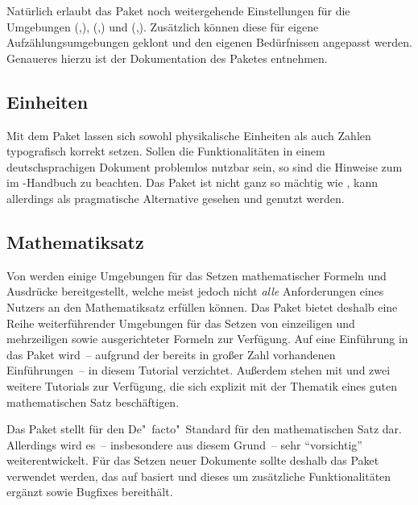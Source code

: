 \documentclass[%
  english,ngerman,%
  cdgeometry=no,DIV=12,%
  automark,%
  listof=toc,%
]{tudscrartcl}
\begin{document}
Natürlich erlaubt das Paket noch weitergehende Einstellungen für die Umgebungen 
(,),
(,) und
(,). 
Zusätzlich können diese für eigene Aufzählungsumgebungen geklont und den 
eigenen Bedürfnissen angepasst werden. Genaueres hierzu ist der Dokumentation 
des Paketes  entnehmen.


\subsection{Einheiten}
Mit dem Paket  lassen sich sowohl physikalische Einheiten als 
auch Zahlen typografisch korrekt setzen. Sollen die Funktionalitäten in einem 
deutschsprachigen Dokument problemlos nutzbar sein, so sind die Hinweise zum 
 im 
\TUDScript-Handbuch zu beachten. Das Paket  ist nicht ganz so 
mächtig wie , kann allerdings als pragmatische Alternative 
gesehen und genutzt werden.


\subsection{Mathematiksatz}
Von  werden einige Umgebungen für das Setzen mathematischer 
Formeln und Ausdrücke bereitgestellt, welche meist jedoch nicht \emph{alle} 
Anforderungen eines Nutzers an den Mathematiksatz erfüllen können. Das Paket
 bietet deshalb eine Reihe weiterführender Umgebungen für das 
Setzen von einzeiligen und mehrzeiligen sowie ausgerichteter Formeln zur 
Verfügung. Auf eine Einführung in das Paket wird~-- aufgrund der bereits in 
großer Zahl vorhandenen Einführungen~-- in diesem Tutorial verzichtet. Außerdem 
stehen mit  und  zwei weitere Tutorials 
zur Verfügung, die sich explizit mit der Thematik eines guten mathematischen 
Satz beschäftigen.

Das Paket  stellt für  den De"~facto"~Standard 
für den mathematischen Satz dar. Allerdings wird es~-- insbesondere aus diesem 
Grund~-- sehr \enquote{vorsichtig} weiterentwickelt. Für das Setzen neuer 
Dokumente sollte deshalb das Paket  verwendet werden, das
auf  basiert und dieses um zusätzliche Funktionalitäten 
ergänzt sowie Bugfixes bereithält.
\end{document}
